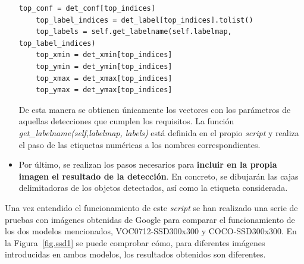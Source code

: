\begin{itemize}
\begin{lstlisting}[frame=single]
	top_conf = det_conf[top_indices]
	top_label_indices = det_label[top_indices].tolist()
	top_labels = self.get_labelname(self.labelmap, top_label_indices)
	top_xmin = det_xmin[top_indices]
	top_ymin = det_ymin[top_indices]
	top_xmax = det_xmax[top_indices]
	top_ymax = det_ymax[top_indices]
	\end{lstlisting}
	De esta manera se obtienen únicamente los vectores con los parámetros de aquellas detecciones que cumplen los requisitos. La función \textit{get\_labelname(self,labelmap, labels)} está definida en el propio \textit{script} y realiza el paso de las etiquetas numéricas a los nombres correspondientes.
	\item Por último, se realizan los pasos necesarios para \textbf{incluir en la propia imagen el resultado de la detección}. En concreto, se dibujarán las cajas delimitadoras de los objetos detectados, así como la etiqueta considerada.
\end{itemize}

Una vez entendido el funcionamiento de este \textit{script} se han realizado una serie de pruebas con imágenes obtenidas de Google para comparar el funcionamiento de los dos modelos mencionados, VOC0712-SSD300x300 y COCO-SSD300x300. En la Figura~\ref{fig.ssd1} se puede comprobar cómo, para diferentes imágenes introducidas en ambos modelos, los resultados obtenidos son diferentes.

